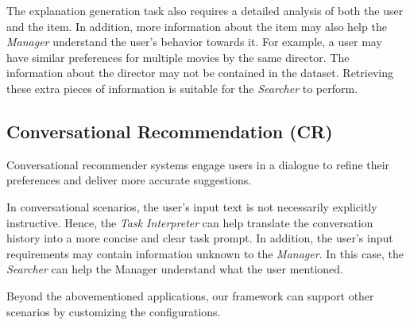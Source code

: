 The explanation generation task also requires a detailed analysis of both the user and the item.
In addition, more information about the item may also help the \textsl{Manager} understand the user's behavior towards it.
For example, a user may have similar preferences for multiple movies by the same director.
The information about the director may not be contained in the dataset.
Retrieving these extra pieces of information is suitable for the \textsl{Searcher} to perform.


\subsection{Conversational Recommendation (CR)}
Conversational recommender systems engage users in a dialogue to refine their preferences and deliver more accurate suggestions.

In conversational scenarios, the user's input text is not necessarily explicitly instructive.
Hence, the \textsl{Task Interpreter} can help translate the conversation history into a more concise and clear task prompt.
In addition, the user's input requirements may contain information unknown to the \textsl{Manager}. %
In this case, the \textsl{Searcher} can help the Manager understand what the user mentioned.

Beyond the abovementioned applications, our framework can support other scenarios by customizing the configurations.

